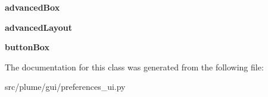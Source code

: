 \begin{DoxyCompactItemize}
\item 
{\bfseries advanced\+Box}\hypertarget{classplume-creator_1_1src_1_1plume_1_1gui_1_1preferences__ui_1_1_ui___preferences_ae1e8e8a8d5e5a61ac96d33f340bf7fd3}{}\label{classplume-creator_1_1src_1_1plume_1_1gui_1_1preferences__ui_1_1_ui___preferences_ae1e8e8a8d5e5a61ac96d33f340bf7fd3}

\item 
{\bfseries advanced\+Layout}\hypertarget{classplume-creator_1_1src_1_1plume_1_1gui_1_1preferences__ui_1_1_ui___preferences_a5deff043568cc99f11d49f53a49fe14c}{}\label{classplume-creator_1_1src_1_1plume_1_1gui_1_1preferences__ui_1_1_ui___preferences_a5deff043568cc99f11d49f53a49fe14c}

\item 
{\bfseries button\+Box}\hypertarget{classplume-creator_1_1src_1_1plume_1_1gui_1_1preferences__ui_1_1_ui___preferences_a3fdb0f1a7b8e6f575e6b049e14bd6f69}{}\label{classplume-creator_1_1src_1_1plume_1_1gui_1_1preferences__ui_1_1_ui___preferences_a3fdb0f1a7b8e6f575e6b049e14bd6f69}

\end{DoxyCompactItemize}


The documentation for this class was generated from the following file\+:\begin{DoxyCompactItemize}
\item 
src/plume/gui/preferences\+\_\+ui.\+py\end{DoxyCompactItemize}
